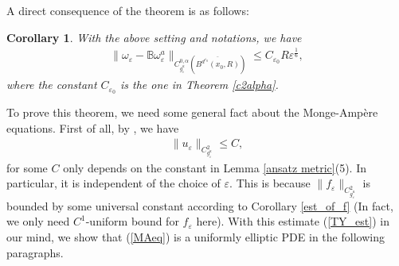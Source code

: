 \documentclass[11pt]{amsart}
\theoremstyle{plain}
\newtheorem{cor}[thm]{Corollary}
\theoremstyle{definition}
\numberwithin{equation}{section}
\renewcommand{\leq}{\leqslant}
\renewcommand{\epsilon}{\varepsilon}
\begin{document}
A direct consequence of the theorem is as follows:
\begin{cor} \label{cor: limit}
	With the above setting and notations, we have 
	     \begin{align}
	     	\| \omega_{\epsilon} -\mathbb{B}\omega_{\epsilon}^a\|_{C^{0,\alpha}_{g_{\varepsilon}^a}(\overline{B^{d^{\varepsilon_0}}(x_0,R)})}\leq C_{\epsilon_0} R\varepsilon^{\frac{1}{6}},
	     \end{align} where the constant $C_{\epsilon_0}$ is the one in Theorem \ref{c2alpha}.
\end{cor}

To prove this theorem, we need some general fact about the Monge-Amp\`ere equations. First of all, by \cite[Theorem 1.1]{TY}, we have
\begin{align}\label{TY_est}
\|u_{\varepsilon}\|_{C^2_{g_{\varepsilon}^a}}\leq C,
\end{align}
for some $C$ only depends on the constant in Lemma \ref{ansatz metric}(5). In particular, it is independent of the choice of $\varepsilon$. This is because $\|f_{\varepsilon}\|_{C^2_{g_{\varepsilon}^a}}$ is bounded by some universal constant according to Corollary \ref{est_of_f} (In fact, we only need $C^1$-uniform bound for $f_{\varepsilon}$ here). With this estimate (\ref{TY_est}) in our mind, we show that (\ref{MAeq}) is a uniformly elliptic PDE in the following paragraphs.
\end{document}
